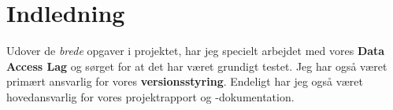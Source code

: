 \section{Indledning}

Udover de \textit{brede} opgaver i projektet, har jeg specielt arbejdet med vores \textbf{Data Access Lag} og sørget for at det har været grundigt testet. Jeg har også været primært ansvarlig for vores \textbf{versionsstyring}. Endeligt har jeg også været hovedansvarlig for vores projektrapport og -dokumentation. 
